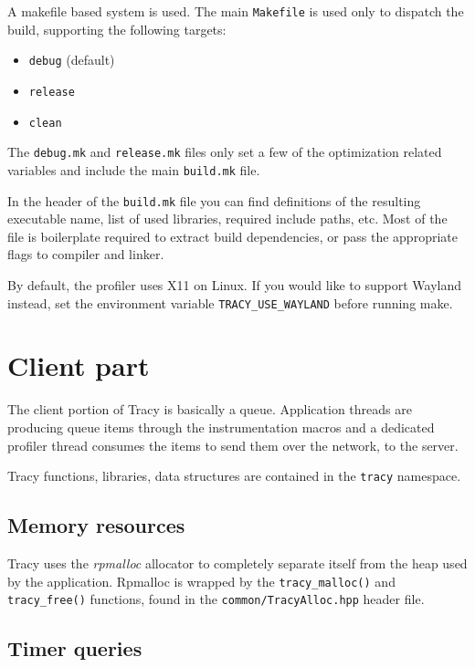 \documentclass[hidelinks,titlepage,a4paper]{article}
\begin{document}
A makefile based system is used. The main \texttt{Makefile} is used only to dispatch the build, supporting the following targets:

\begin{itemize}
\item \texttt{debug} (default)
\item \texttt{release}
\item \texttt{clean}
\end{itemize}

The \texttt{debug.mk} and \texttt{release.mk} files only set a few of the optimization related variables and include the main \texttt{build.mk} file.

In the header of the \texttt{build.mk} file you can find definitions of the resulting executable name, list of used libraries, required include paths, etc. Most of the file is boilerplate required to extract build dependencies, or pass the appropriate flags to compiler and linker.

By default, the profiler uses X11 on Linux.  If you would like to support Wayland instead, set the environment variable \texttt{TRACY\_USE\_WAYLAND} before running make.

\section{Client part}

The client portion of Tracy is basically a queue. Application threads are producing queue items through the instrumentation macros and a dedicated profiler thread consumes the items to send them over the network, to the server.

Tracy functions, libraries, data structures are contained in the \texttt{tracy} namespace.

\subsection{Memory resources}

Tracy uses the \emph{rpmalloc} allocator to completely separate itself from the heap used by the application. Rpmalloc is wrapped by the \texttt{tracy\_malloc()} and \texttt{tracy\_free()} functions, found in the \texttt{common/TracyAlloc.hpp} header file.

\subsection{Timer queries}
\label{timerqueries}
\end{document}
